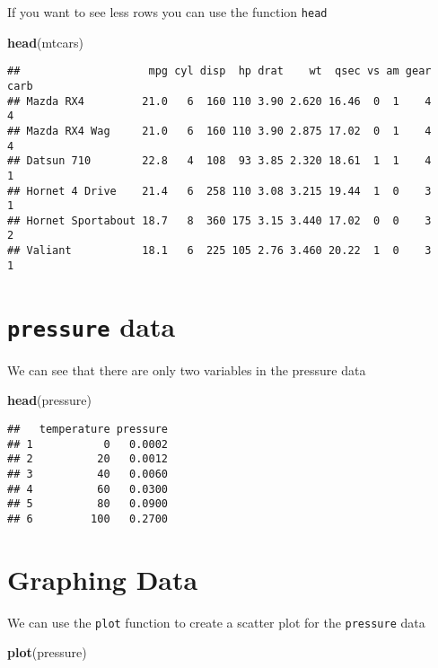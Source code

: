 \documentclass[
]{book}
\newenvironment{Shaded}{\begin{snugshade}}{\end{snugshade}}
\newcommand{\KeywordTok}[1]{\textcolor[rgb]{0.13,0.29,0.53}{\textbf{#1}}}
\newcommand{\NormalTok}[1]{#1}
\begin{document}
If you want to see less rows you can use the function \texttt{head}

\begin{Shaded}
\begin{Highlighting}[]
\KeywordTok{head}\NormalTok{(mtcars)}
\end{Highlighting}
\end{Shaded}

\begin{verbatim}
##                    mpg cyl disp  hp drat    wt  qsec vs am gear carb
## Mazda RX4         21.0   6  160 110 3.90 2.620 16.46  0  1    4    4
## Mazda RX4 Wag     21.0   6  160 110 3.90 2.875 17.02  0  1    4    4
## Datsun 710        22.8   4  108  93 3.85 2.320 18.61  1  1    4    1
## Hornet 4 Drive    21.4   6  258 110 3.08 3.215 19.44  1  0    3    1
## Hornet Sportabout 18.7   8  360 175 3.15 3.440 17.02  0  0    3    2
## Valiant           18.1   6  225 105 2.76 3.460 20.22  1  0    3    1
\end{verbatim}

\hypertarget{pressure-data}{%
\section{\texorpdfstring{\texttt{pressure} data}{pressure data}}\label{pressure-data}}

We can see that there are only two variables in the pressure data

\begin{Shaded}
\begin{Highlighting}[]
\KeywordTok{head}\NormalTok{(pressure)}
\end{Highlighting}
\end{Shaded}

\begin{verbatim}
##   temperature pressure
## 1           0   0.0002
## 2          20   0.0012
## 3          40   0.0060
## 4          60   0.0300
## 5          80   0.0900
## 6         100   0.2700
\end{verbatim}

\hypertarget{graphing-data}{%
\section{Graphing Data}\label{graphing-data}}

We can use the \texttt{plot} function to create a scatter plot for the \texttt{pressure} data

\begin{Shaded}
\begin{Highlighting}[]
\KeywordTok{plot}\NormalTok{(pressure)}
\end{Highlighting}
\end{Shaded}
\end{document}
